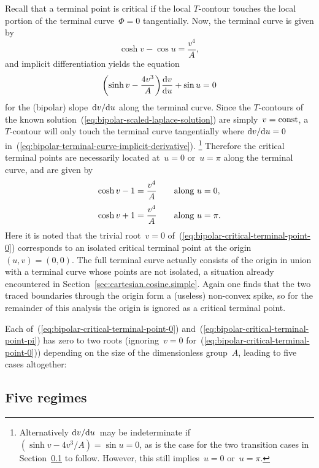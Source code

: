 Recall that a terminal point is critical
if the local $T$-contour touches
the local portion of the terminal curve~$\Phi = 0$ tangentially.
Now, the terminal curve is given by
\begin{equation}
  \cosh v - \cos u = \frac{v^4}{A},
  \label{eq:bipolar-terminal-curve}
\end{equation}
and implicit differentiation yields the equation
\begin{equation}
  \roundbr*{\sinh v - \frac{4 v^3}{A}} \tder{v}{u} + \sin u = 0
  \label{eq:bipolar-terminal-curve-implicit-derivative}
\end{equation}
for the (bipolar) slope~$\mathop{}\!\mathrm{d} v / {\mathop{}\!\mathrm{d} u}$
along the terminal curve.
Since the $T$-contours
of the known solution~(\ref{eq:bipolar-scaled-laplace-solution})
are simply~$v = \mathrm{const}$,
a $T$-contour will only touch the terminal curve tangentially
where $\mathop{}\!\mathrm{d} v / {\mathop{}\!\mathrm{d} u} = 0$
in~(\ref{eq:bipolar-terminal-curve-implicit-derivative}).%
\footnote{
  Alternatively $\mathop{}\!\mathrm{d} v / {\mathop{}\!\mathrm{d} u}$~may be indeterminate
  if~$(\sinh v - 4 v^3 / A) = \sin u = 0$,
  as is the case for the two transition cases
  in Section~\ref{sec:bipolar.viable.regimes} to follow.
  However, this still implies~$u = 0$ or~$u = \pi$.
}
Therefore the critical terminal points are necessarily located
at~$u = 0$ or~$u = \pi$ along the terminal curve,
and are given by
\begin{align}
  \cosh v - 1 &= \frac{v^4}{A} \eqnspace \text{along~$u = 0$},
  \label{eq:bipolar-critical-terminal-point-0}
    \\[\tallspace]
  \cosh v + 1 &= \frac{v^4}{A} \eqnspace \text{along~$u = \pi$}.
  \label{eq:bipolar-critical-terminal-point-pi}
\end{align}
Here it is noted that the trivial root~$v = 0$
of~(\ref{eq:bipolar-critical-terminal-point-0})
corresponds to an isolated critical terminal point
at the origin~$(u, v) = (0, 0)$.
The full terminal curve actually consists of the origin
in union with a  terminal curve
whose points are not isolated,
a situation already encountered
in Section~\ref{sec:cartesian.cosine.simple}.
Again one finds that the two traced boundaries through the origin
form a (useless) non-convex spike,
so for the remainder of this analysis
the origin is ignored as a critical terminal point.

Each of~(\ref{eq:bipolar-critical-terminal-point-0})
and~(\ref{eq:bipolar-critical-terminal-point-pi})
has zero to two roots
(ignoring~$v = 0$ for~(\ref{eq:bipolar-critical-terminal-point-0}))
depending on the size of the dimensionless group~$A$,
leading to five cases altogether:

\subsection{Five regimes}
\label{sec:bipolar.viable.regimes}
